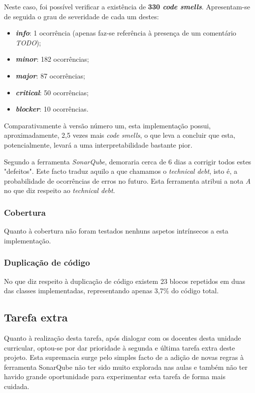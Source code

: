 \documentclass[a4paper]{report}
\begin{document}
Neste caso, foi possível verificar a existência de \textbf{330 \textit{code smells}}. Apresentam-se de seguida o grau de severidade de cada um destes:
\begin{itemize}
    \item \textbf{\textit{info}}: 1 ocorrência (apenas faz-se referência à presença de um comentário \textit{TODO});
    \item \textbf{\textit{minor}}: 182 ocorrências;
    \item \textbf{\textit{major}}: 87 ocorrências;
    \item \textbf{\textit{critical}}: 50 ocorrências;
    \item \textbf{\textit{blocker}}: 10 ocorrências.
\end{itemize}

Comparativamente à versão número um, esta implementação possui, aproximadamente, 2,5 vezes mais \textit{code smells}, o que leva a concluir que esta, potencialmente, levará a uma interpretabilidade bastante pior.

Segundo a ferramenta \textit{SonarQube}, demoraria cerca de 6 dias a corrigir todos estes "defeitos". Este facto traduz aquilo a que chamamos o \textit{technical debt}, isto é, a probabilidade de ocorrências de erros no futuro. Esta ferramenta atribui a nota \textit{A} no que diz respeito ao \textit{technical debt}.

\subsubsection{Cobertura}
Quanto à cobertura não foram testados nenhuns aspetos intrínsecos a esta implementação.

\subsubsection{Duplicação de código}
No que diz respeito à duplicação de código existem 23 blocos repetidos em duas das classes implementadas, representando apenas 3,7\% do código total.

\subsection{Tarefa extra}
Quanto à realização desta tarefa, após dialogar com os docentes desta unidade curricular, optou-se por dar prioridade à segunda e última tarefa extra deste projeto. Esta supremacia surge pelo simples facto de a adição de novas regras à ferramenta SonarQube não ter sido muito explorada nas aulas e também não ter havido grande oportunidade para experimentar esta tarefa de forma mais cuidada.
\end{document}

